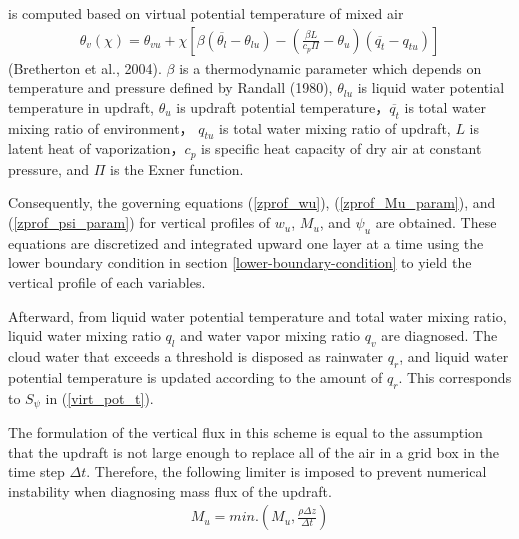 is computed based on virtual potential temperature of mixed air \begin{eqnarray}\label{virt_pot_t}
    \theta_v(\chi)=\theta_{vu}+\chi\left[ \beta(\overline{\theta_l}-\theta_{lu})-\left(\frac{\beta L}{c_p\Pi}-\theta_u\right)(\overline{q_t}-q_{tu})\right]\end{eqnarray} (Bretherton et al., 2004). \(\beta\) is a
thermodynamic parameter which depends on temperature and pressure defined by Randall (1980), \(\theta_{lu}\) is liquid water potential temperature in updraft, \(\theta_u\) is updraft potential
temperature，\(\overline{q_t}\) is total water mixing ratio of environment， \(q_{tu}\) is total water mixing ratio of updraft, \(L\) is latent heat of vaporization，\(c_p\) is specific heat capacity
of dry air at constant pressure, and \(\Pi\) is the Exner function.

Consequently, the governing equations (\ref{zprof_wu}{}), (\ref{zprof_Mu_param}{}), and (\ref{zprof_psi_param}) for vertical profiles of \(w_u\), \(M_u\),
and \(\psi_u\) are obtained. These equations are discretized and integrated upward one layer at a time using the lower boundary condition in section \ref{lower-boundary-condition} to
yield the vertical profile of each variables.

Afterward, from liquid water potential temperature and total water mixing ratio, liquid water mixing ratio \(q_l\) and water vapor mixing ratio \(q_v\) are diagnosed. The cloud water that exceeds a
threshold is disposed as rainwater \(q_r\), and liquid water potential temperature is updated according to the amount of \(q_r\). This corresponds to \(S_\psi\) in (\ref{virt_pot_t}).

The formulation of the vertical flux in this scheme is equal to the assumption that the updraft is not large enough to replace all of the air in a grid box in the time step \(\Delta t\). Therefore,
the following limiter is imposed to prevent numerical instability when diagnosing mass flux of the updraft. \begin{eqnarray}\label{Mu_limit}
    M_u = min.\left(M_u, \frac{\rho\Delta z}{\Delta t}\right)\end{eqnarray}
